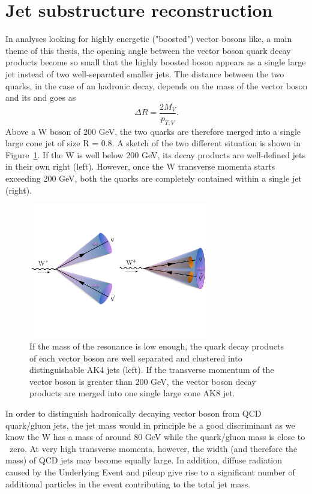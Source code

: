 \section{Jet substructure reconstruction}
\label{sec:objreco:substructure}
In analyses looking for highly energetic ("boosted") vector bosons like, a main theme of this thesis, the opening angle between the vector boson quark decay products become so small that the highly boosted boson appears as a single large jet instead of two well-separated smaller jets. The distance between the two quarks, in the case of an hadronic decay, depends on the mass of the vector boson and its \PT and goes as
\begin{equation}  
\Delta R = \frac{2 M_{V}}{p_{T,V}}.  
\end{equation}
Above a W boson \PT of 200 GeV, the two quarks are therefore merged into a single large cone jet of size R = 0.8. A sketch of the two different situation is shown in Figure~\ref{fig:objreco:mergedvsunmerged}. If the W \PT is well below 200 GeV, its decay products are well-defined jets in their own right (left). However, once the W transverse momenta starts exceeding 200 GeV, both the quarks are completely contained within a single jet (right).
\begin{figure}[h] 
    \centering
    \includegraphics[width=0.70\textwidth]{figures/event_reconstruction/merged_vs_unmerged.pdf}
    \caption{If the mass of the resonance is low enough, the quark decay products of each vector boson are well separated and clustered into distinguishable AK4 jets (left). If the transverse momentum of the vector boson is greater than 200 GeV, the vector boson decay products are merged into one single large cone AK8 jet.}
    \label{fig:objreco:mergedvsunmerged}
\end{figure}
In order to distinguish hadronically decaying vector boson from QCD quark/gluon jets, the jet mass would in principle be a good discriminant as we know the W has a mass of around 80 GeV while the quark/gluon mass is close to ~zero. At very high transverse momenta, however, the width (and therefore the mass) of QCD jets may become equally large. In addition, diffuse radiation caused by the Underlying Event and pileup give rise to a significant number of additional particles in the event contributing to the total jet mass.
